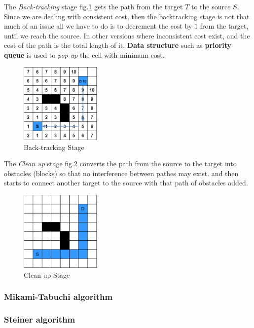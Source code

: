     The \textit{Back-tracking} stage fig.\ref{fig:backtrackingStage} gets the path from the target $T$
    to the source $S$.
    Since we are dealing with consistent cost, then the backtracking stage is not that much of an issue
    all we have to do is to decrement the cost by $1$ from the target, until we reach the source.
    In other versions where inconsistent cost exist, and the cost of the path is the total length of it.
    \textbf{Data structure} such as \textbf{priority queue} is used to \textit{pop-up}
    the cell with minimum cost.

    \begin{figure}[H]
        \centering
        \includegraphics[width=0.35\textwidth]{figures/Lee Stages/back-track.png}
        \caption{Back-tracking Stage}
        \label{fig:backtrackingStage}
    \end{figure}

    The \textit{Clean up} stage fig.\ref{fig:cleanUpStage} converts the path from the source
    to the target into obstacles (blocks) so that no interference between pathes may exist.
    and then starts to connect another target to the source with that path of obstacles added.

    \begin{figure}[H]
        \centering
        \includegraphics[width=0.35\textwidth]{figures/Lee Stages/clean_up.png}
        \caption{Clean up Stage}
        \label{fig:cleanUpStage}
    \end{figure}

    \subsubsection{Mikami-Tabuchi algorithm}
    \label{MikamiSection}
    \subsubsection{Steiner algorithm}
    \label{SteinerSection}
    
